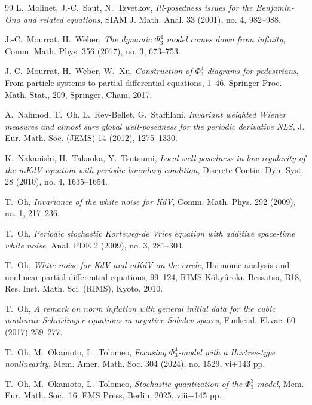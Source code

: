 \documentclass[letterpaper, 11pt,  reqno]{amsart}
\newcommand{\1}{\hspace{0.5mm}\text{I}\hspace{0.5mm}}
\numberwithin{equation}{section}
\numberwithin{theorem}{section}
\begin{document}
\begin{thebibliography}{99}
L.~Molinet, J.-C.~Saut, N.~Tzvetkov, 
{\it Ill-posedness issues for the Benjamin-Ono and related equations},
SIAM J. Math. Anal. 33 (2001), no. 4, 982--988. 




J.-C.~Mourrat, H.~Weber,
{\it The dynamic $\Phi^4_3$ model comes down from infinity}, 
Comm. Math. Phys. 356 (2017), no. 3, 673--753.



J.-C.~Mourrat, H.~Weber, W.~Xu,
{\it Construction of $\Phi^4_3$ diagrams for pedestrians},
 From particle systems to partial differential equations, 1--46, Springer Proc. Math. Stat., 209, Springer, Cham, 2017. 


A.~Nahmod, T.~Oh, L.~Rey-Bellet, G.~Staffilani,
{\it  Invariant weighted Wiener measures and almost sure global well-posedness for the periodic derivative NLS}, 
J. Eur. Math. Soc. (JEMS) 14 (2012), 1275--1330. 


K.~Nakanishi, H.~Takaoka, Y.~Tsutsumi, 
{\it Local well-posedness in low regularity of the mKdV equation with periodic boundary condition},
 Discrete Contin. Dyn. Syst. 28 (2010), no. 4, 1635--1654. 
 
% 
%
T.~Oh,
{\it Invariance of the white noise for KdV},
Comm. Math. Phys. 292 (2009), no. 1, 217--236.




T.~Oh, 
{\it Periodic stochastic Korteweg-de Vries equation with additive space-time white noise}, 
Anal. PDE 2 (2009), no. 3, 281--304. 




T.~Oh,
{\it White noise for KdV and mKdV on the circle},
Harmonic analysis and nonlinear partial differential equations, 99--124, 
RIMS K\^oky\^uroku Bessatsu, B18, Res. Inst. Math. Sci. (RIMS), Kyoto, 2010.


T.~Oh,
{\it A remark on norm inflation with general initial data for the cubic nonlinear Schr\"odinger equations in negative Sobolev spaces}, Funkcial. Ekvac. 60 (2017) 259--277. 

T.~Oh, M.~Okamoto, L.~Tolomeo,
{\it Focusing $\Phi^4_3$-model with a Hartree-type nonlinearity}, 
Mem. Amer. Math. Soc. 304 (2024), no. 1529, vi+143 pp. 



T.~Oh, M.~Okamoto, L.~Tolomeo,
{\it Stochastic quantization of the $\Phi^3_3$-model}, 
Mem. Eur. Math. Soc., 16. EMS Press, Berlin, 2025, viii+145 pp. 




\end{thebibliography}
\end{document}
